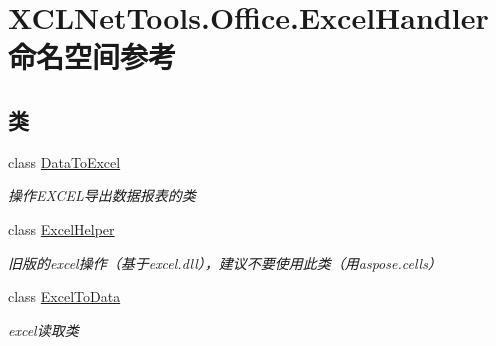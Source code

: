 \hypertarget{namespace_x_c_l_net_tools_1_1_office_1_1_excel_handler}{}\section{X\+C\+L\+Net\+Tools.\+Office.\+Excel\+Handler 命名空间参考}
\label{namespace_x_c_l_net_tools_1_1_office_1_1_excel_handler}
\subsection*{类}
\begin{DoxyCompactItemize}
\item 
class \hyperlink{class_x_c_l_net_tools_1_1_office_1_1_excel_handler_1_1_data_to_excel}{Data\+To\+Excel}
\begin{DoxyCompactList}\small\item\em 操作\+E\+X\+C\+E\+L导出数据报表的类 \end{DoxyCompactList}\item 
class \hyperlink{class_x_c_l_net_tools_1_1_office_1_1_excel_handler_1_1_excel_helper}{Excel\+Helper}
\begin{DoxyCompactList}\small\item\em 旧版的excel操作（基于excel.\+dll），建议不要使用此类（用aspose.\+cells） \end{DoxyCompactList}\item 
class \hyperlink{class_x_c_l_net_tools_1_1_office_1_1_excel_handler_1_1_excel_to_data}{Excel\+To\+Data}
\begin{DoxyCompactList}\small\item\em excel读取类 \end{DoxyCompactList}\end{DoxyCompactItemize}
